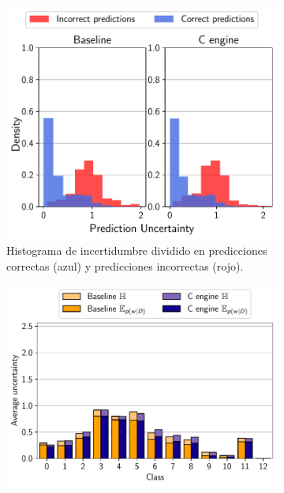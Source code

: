 \begin{figure}[h]
     \centering
     \begin{subfigure}[b]{0.48\textwidth}
         \centering
         \includegraphics[width=\textwidth]{root/Imagenes/4_bnn_riscv/hist_predictions.pdf}
         \caption{Histograma de incertidumbre dividido en predicciones correctas (azul) y predicciones incorrectas (rojo).}
         \label{fig:example_hist}
     \end{subfigure}
     \hfill
     \begin{subfigure}[b]{0.48\textwidth}
         \centering
         \includegraphics[width=\textwidth]{root/Imagenes/4_bnn_riscv/class_uncertainty.pdf}

\end{subfigure}
\end{figure}
